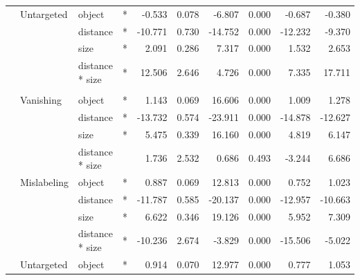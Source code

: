 \begin{longtable}[t]{llllrrrrrr}
\cmidrule{2-10}\nopagebreak
\hspace{1em} & Untargeted & object & * & -0.533 & 0.078 & -6.807 & 0.000 & -0.687 & -0.380\\
\cmidrule{3-10}\nopagebreak
\hspace{1em} &  & distance & * & -10.771 & 0.730 & -14.752 & 0.000 & -12.232 & -9.370\\
\cmidrule{3-10}\nopagebreak
\hspace{1em} &  & size & * & 2.091 & 0.286 & 7.317 & 0.000 & 1.532 & 2.653\\
\cmidrule{3-10}\nopagebreak
\hspace{1em} &  & distance * size & * & 12.506 & 2.646 & 4.726 & 0.000 & 7.335 & 17.711\\
\cmidrule{1-10}\pagebreak[0]
\addlinespace[0.3em]
\multicolumn{10}{l}{\textbf{SSD}}\\
\hspace{1em} & Vanishing & object & * & 1.143 & 0.069 & 16.606 & 0.000 & 1.009 & 1.278\\
\cmidrule{3-10}\nopagebreak
\hspace{1em} &  & distance & * & -13.732 & 0.574 & -23.911 & 0.000 & -14.878 & -12.627\\
\cmidrule{3-10}\nopagebreak
\hspace{1em} &  & size & * & 5.475 & 0.339 & 16.160 & 0.000 & 4.819 & 6.147\\
\cmidrule{3-10}\nopagebreak
\hspace{1em} &  & distance * size &  & 1.736 & 2.532 & 0.686 & 0.493 & -3.244 & 6.686\\
\cmidrule{2-10}\nopagebreak
\hspace{1em} & Mislabeling & object & * & 0.887 & 0.069 & 12.813 & 0.000 & 0.752 & 1.023\\
\cmidrule{3-10}\nopagebreak
\hspace{1em} &  & distance & * & -11.787 & 0.585 & -20.137 & 0.000 & -12.957 & -10.663\\
\cmidrule{3-10}\nopagebreak
\hspace{1em} &  & size & * & 6.622 & 0.346 & 19.126 & 0.000 & 5.952 & 7.309\\
\cmidrule{3-10}\nopagebreak
\hspace{1em} &  & distance * size & * & -10.236 & 2.674 & -3.829 & 0.000 & -15.506 & -5.022\\
\cmidrule{2-10}\nopagebreak
\hspace{1em} & Untargeted & object & * & 0.914 & 0.070 & 12.977 & 0.000 & 0.777 & 1.053\\

\end{longtable}
